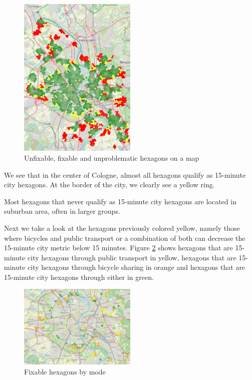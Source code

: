 \begin{figure}
  \begin{center}
    \includegraphics[width=0.50\textwidth]{Figures/results/problematic_hexagons/problematic_hexagons}
  \end{center}
  \caption{Unfixable, fixable and unproblematic hexagons on a map}
  \label{fig:problematic_hexagons}
\end{figure}

We see that in the center of Cologne, almost all hexagons qualify as 15-minute city hexagons. 
At the border of the city, we clearly see a yellow ring.

Most hexagons that never qualify as 15-minute city hexagons are located in suburban area, often in larger groups.

Next we take a look at the hexagons previously colored yellow, namely those where bicycles and public transport or a combination of both can decrease the 15-minute city metric below 15 minutes.
Figure \ref{fig:fixable_hexagons} shows hexagons that are 15-minute city hexagons through public transport in yellow, hexagons that are 15-minute city hexagons through bicycle sharing in orange and hexagons that are 15-minute city hexagons through either in green.

\begin{figure}
  \begin{center}
    \includegraphics[width=0.50\textwidth]{Figures/results/problematic_hexagons/fixable_hexagons}
  \end{center}
  \caption{Fixable hexagons by mode}
  \label{fig:fixable_hexagons}
\end{figure}

